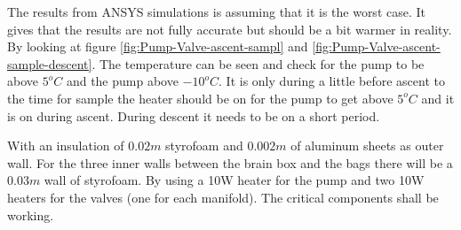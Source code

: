 The results from ANSYS simulations is assuming that it is the worst case. It gives that the results are not fully accurate but should be a bit warmer in reality. By looking at figure \ref{fig:Pump-Valve-ascent-sampl} and \ref{fig:Pump-Valve-ascent-sample-descent}. The temperature can be seen and check for the pump to be above $5^o C$ and the pump above $-10^o C$. It is only during a little before ascent to the time for sample the heater should be on for the pump to get above $5^o C$ and it is on during ascent. During descent it needs to be on a short period.

With an insulation of $0.02m$ styrofoam and $0.002m$ of aluminum sheets as outer wall. For the three inner walls between the brain box and the bags there will be a $0.03m$ wall of styrofoam. By using a 10W heater for the pump and two 10W heaters for the valves (one for each manifold). The critical components shall be working.

